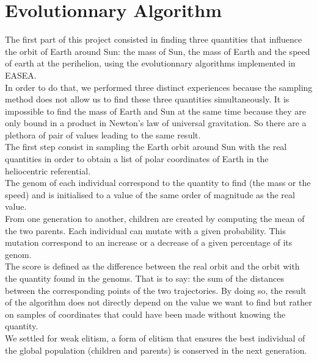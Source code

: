 \section{Evolutionnary Algorithm}
The first part of this project consisted in finding three quantities that influence the orbit of Earth around Sun: the mass of Sun, the mass of Earth and the speed of earth at the perihelion, using the evolutionnary algorithms implemented in EASEA.\\
In order to do that, we performed three distinct experiences because the sampling method does not allow us to find these three quantities simultaneously. It is impossible to find the mass of Earth and Sun at the same time because they are only bound in a product in Newton's law of universal gravitation. So there are a plethora of pair of values leading to the same result.\\
The first step consist in sampling the Earth orbit around Sun with the real quantities in order to obtain a list of polar coordinates of Earth in the heliocentric referential.\\
The genom of each individual correspond to the quantity to find (the mass or the speed) and is initialised to a value of the same order of magnitude as the real value.\\
From one generation to another, children are created by computing the mean of the two parents. Each individual can mutate with a given probability. This mutation correspond to an increase or a decrease of a given percentage of its genom.\\
The score is defined as the difference between the real orbit and the orbit with the quantity found in the genoms. That is to say: the sum of the distances between the corresponding points of the two trajectories. By doing so, the result of the algorithm does not directly depend on the value we want to find but rather on samples of coordinates that could have been made without knowing the quantity.\\
We settled for weak elitism, a form of elitism that ensures the best individual of the global population (children and parents) is conserved in the next generation.


